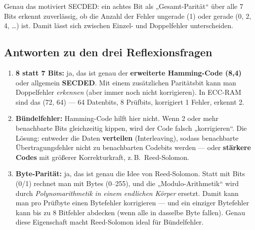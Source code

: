 Genau das motiviert SECDED: ein achtes Bit als „Gesamt-Parität“ über
alle 7 Bits erkennt zuverlässig, ob die Anzahl der Fehler ungerade
(1) oder gerade (0, 2, 4, \dots) ist. Damit lässt sich zwischen
Einzel- und Doppelfehler unterscheiden.

\subsection*{Antworten zu den drei Reflexionsfragen}

\begin{enumerate}
\item \textbf{8 statt 7 Bits:} ja, das ist genau der \textbf{erweiterte
  Hamming-Code (8,4)} oder allgemein \textbf{SECDED}. Mit einem
  zusätzlichen Paritätsbit kann man Doppelfehler \emph{erkennen} (aber
  immer noch nicht korrigieren). In ECC-RAM sind das (72, 64) — 64
  Datenbits, 8 Prüfbits, korrigiert 1 Fehler, erkennt 2.

\item \textbf{Bündelfehler:} Hamming-Code hilft hier nicht. Wenn 2
  oder mehr benachbarte Bits gleichzeitig kippen, wird der Code
  falsch „korrigieren“. Die Lösung: entweder die Daten
  \textbf{verteilen} (Interleaving), sodass benachbarte
  Übertragungsfehler nicht zu benachbarten Codebits werden — oder
  \textbf{stärkere Codes} mit größerer Korrekturkraft, z.\,B.\
  Reed-Solomon.

\item \textbf{Byte-Parität:} ja, das ist genau die Idee von
  Reed-Solomon. Statt mit Bits (0/1) rechnet man mit Bytes (0–255),
  und die „Modulo-Arithmetik“ wird durch \emph{Polynomarithmetik in
  einem endlichen Körper} ersetzt. Damit kann man pro Prüfbyte einen
  Bytefehler korrigieren — und ein einziger Bytefehler kann bis zu 8
  Bitfehler abdecken (wenn alle in dasselbe Byte fallen). Genau diese
  Eigenschaft macht Reed-Solomon ideal für Bündelfehler.
\end{enumerate}
